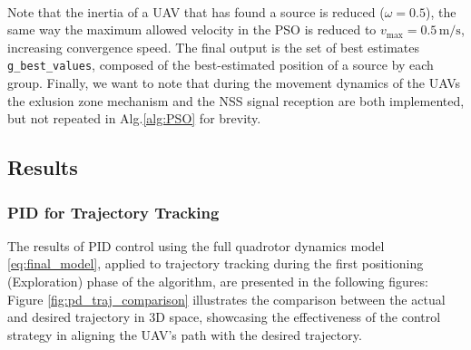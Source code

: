 \documentclass[main]{subfiles}
\begin{document}
\noindent\\
Note that the inertia of a UAV that has found a source 
is reduced (\(\omega = 0.5\)), the same way the maximum allowed velocity
in the PSO is reduced to $v_\text{max}=0.5 \, \text{m/s}$, increasing
convergence speed. The final output is the set of best estimates 
\texttt{g\_best\_values}, composed of the best-estimated position 
of a source by each group.
Finally, we want to note that during the movement dynamics
of the UAVs the exlusion zone mechanism and the NSS signal reception
are both implemented, but not repeated in Alg.\ref{alg:PSO} for brevity.

\newpage
\subsection{Results}
\subsubsection{PID for Trajectory Tracking}
The results of PID control using the full quadrotor dynamics 
model \eqref{eq:final_model},
applied to trajectory tracking during the first positioning 
(Exploration) phase of the algorithm, 
are presented in the following figures: 
Figure \ref{fig:pd_traj_comparison} illustrates 
the comparison between the actual and desired trajectory in 3D space, 
showcasing the effectiveness of the control strategy in 
aligning the UAV's path with the desired trajectory.
\end{document}
